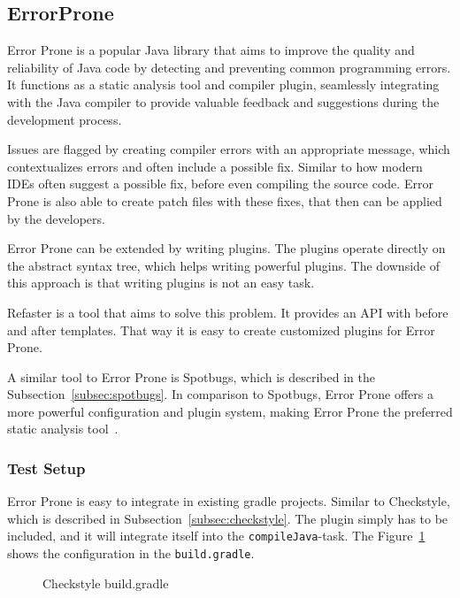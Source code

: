 \subsection{ErrorProne}\label{subsec:errorprone}
Error Prone is a popular Java library that aims to improve the quality and reliability of Java code by detecting and preventing common programming errors.
It functions as a static analysis tool and compiler plugin, seamlessly integrating with the Java compiler to provide valuable feedback and suggestions during the development process.

Issues are flagged by creating compiler errors with an appropriate message, which contextualizes errors and often include a possible fix.
Similar to how modern IDEs often suggest a possible fix, before even compiling the source code.
Error Prone is also able to create patch files with these fixes, that then can be applied by the developers.

Error Prone can be extended by writing plugins.
The plugins operate directly on the abstract syntax tree, which helps writing powerful plugins.
The downside of this approach is that writing plugins is not an easy task.

Refaster is a tool that aims to solve this problem.
It provides an API with before and after templates.
That way it is easy to create customized plugins for Error Prone.

A similar tool to Error Prone is Spotbugs, which is described in the Subsection\ \ref{subsec:spotbugs}.
In comparison to Spotbugs, Error Prone offers a more powerful configuration and plugin system, making Error Prone the preferred static analysis tool~\cite{errorprone}.

\subsubsection{Test Setup}
Error Prone is easy to integrate in existing gradle projects.
Similar to Checkstyle, which is described in Subsection\ \ref{subsec:checkstyle}.
The plugin simply has to be included, and it will integrate itself into the \texttt{compileJava}-task.
The Figure\ \ref{fig:errorprone-gradle} shows the configuration in the \texttt{build.gradle}.

\begin{figure}[h]
    \caption{Checkstyle build.gradle}
    
    \label{fig:errorprone-gradle}
\end{figure}

